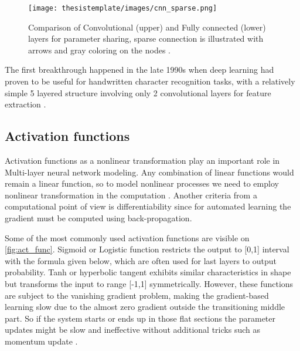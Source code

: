 \begin{figure}[ht!]
  \begin{center}
    \texttt{[image: thesistemplate/images/cnn\_sparse.png]}
    \caption{Comparison of Convolutional (upper) and Fully connected (lower) layers for parameter sharing, sparse connection is illustrated with arrows and gray coloring on the nodes \cite{DL_book_Goodfellow}.}
    \label{fig:cnn_parshare}
  \end{center}
\end{figure}


The first breakthrough happened in the late 1990s when deep learning had proven to be useful for handwritten character recognition tasks, with a relatively simple 5 layered structure involving only 2 convolutional layers for feature extraction \cite{lecun1998CNN}.


\subsection{Activation functions}

Activation functions as a nonlinear transformation play an important role in Multi-layer neural network modeling. Any combination of linear functions would remain a linear function, so to model nonlinear processes we need to employ nonlinear transformation in the computation \cite{nwankpa2018activation}. Another criteria from a computational point of view is differentiability since for automated learning the gradient must be computed using back-propagation. 

Some of the most commonly used activation functions are visible on \autoref{fig:act_func}. Sigmoid or Logistic function restricts the output to [0,1] interval with the formula given below, which are often used for last layers to output probability. Tanh or hyperbolic tangent exhibits similar characteristics in shape but transforms the input to range [-1,1] symmetrically. However, these functions are subject to the vanishing gradient problem, making the gradient-based learning slow due to the almost zero gradient outside the transitioning middle part. So if the system starts or ends up in those flat sections the parameter updates might be slow and ineffective without additional tricks such as momentum update \cite{QIAN1999145momentum}.

